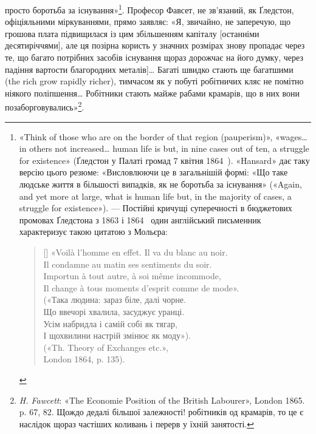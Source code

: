 просто боротьба за існування»\footnote{
«Think of those who are on the border of that region (pauperism)»,
«wages\dots{} in others not increased\dots{} human life is but, in nine cases out of ten,
a struggle for existence» (Ґледстон у Палаті громад 7 квітня 1864~).
«Hansard» дає таку версію цього резюме: «Висловлюючи це в загальнішій
формі: «Що таке людське життя в більшості випадків, як не боротьба
за існування» («Again, and yet more at large, what is human life but,
in the majority of cases, a struggle for existence»). — Постійні кричущі суперечності
в бюджетових промовах Ґледстона з 1863 і 1864~ один англійський
письменник характеризує такою цитатою з Мольєра:

\settowidth{\versewidth}{Il change à tous moments d’esprit comme de mode».}
\begin{verse}[\versewidth]
«Voilà l’homme en effet. Il va du blanc au noir. \\
Il condamne au matin ses sentiments du soir. \\
Importun à tout autre, à soi même incommode, \\
Il change à tous moments d’esprit comme de mode». \\

(«Така людина: зараз біле, далі чорне. \\
Що ввечорі хвалила, засуджує уранці. \\
Усім набридла і самій собі як тягар, \\
І щохвилини настрій змінює як моду»). \\

(«Th. Theory of Exchanges etc.», \\
London 1864, p. 135).
\end{verse}

}. Професор Фавсет, не зв’язаний,
як Ґледстон, офіціяльними міркуваннями, прямо заявляє:
«Я, звичайно, не заперечую, що грошова плата підвищилася із
цим збільшенням капіталу [останніми десятиріччями], але ця
позірна користь у значних розмірах знову пропадає через те,
що багато потрібних засобів існування щораз дорожчає на його
думку, через падіння вартости благородних металів]\dots{} Багаті
швидко стають ще багатшими (the rich grow rapidly richer),
тимчасом як у побуті робітничих кляс не помітно ніякого поліпшення\dots{}
Робітники стають майже рабами крамарів, що в них
вони позаборговувались»\footnote{
\emph{H. Fawcett}: «The Economie Position of the British Labourer»,
London 1865. p. 67, 82. Щождо дедалі більшої залежності! робітників од
крамарів, то це є наслідок щораз частіших коливань і перерв у їхній
занятості.
}.

